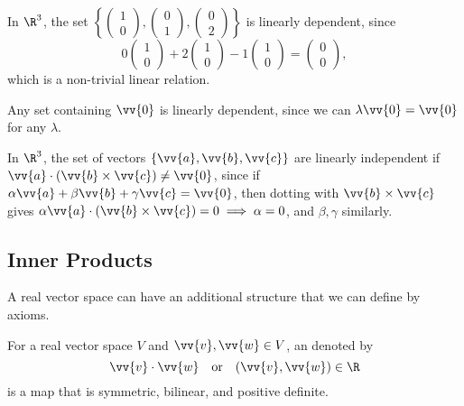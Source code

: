 \begin{example}
    In $\R^3$, the set $\left\{\begin{pmatrix}1 \\ 0\end{pmatrix}, \begin{pmatrix}0 \\ 1\end{pmatrix}, \begin{pmatrix}0 \\ 2\end{pmatrix}\right\}$ is linearly dependent, since
    $$
    0\begin{pmatrix}1 \\ 0\end{pmatrix} + 2\begin{pmatrix}1 \\ 0\end{pmatrix} - 1\begin{pmatrix}1 \\ 0\end{pmatrix} = \begin{pmatrix}0 \\ 0\end{pmatrix},
    $$
    which is a non-trivial linear relation.
\end{example}

Any set containing $\vv{0}$ is linearly dependent, since we can $\lambda \vv{0} = \vv{0}$ for any $\lambda$.

In $\R^3$, the set of vectors $\{\vv{a}, \vv{b}, \vv{c}\}$ are linearly independent if $\vv{a} \cdot (\vv{b} \times \vv{c}) \neq \vv{0}$, since if $\alpha \vv{a} + \beta \vv{b} + \gamma \vv{c} = \vv{0}$, then dotting with $\vv{b} \times \vv{c}$ gives $\alpha \vv{a} \cdot (\vv{b} \times \vv{c}) = 0 \implies \alpha = 0$, and $\beta, \gamma$ similarly.


\subsection{Inner Products}

A real vector space can have an additional structure that we can define by axioms.

\begin{definition}
    For a real vector space $V$ and $\vv{v}, \vv{w} \in V$, an  denoted by
    $$
    \vv{v} \cdot \vv{w} \quad \text{or} \quad (\vv{v}, \vv{w}) \in \R
    $$
    is a map that is symmetric, bilinear, and positive definite.
\end{definition}

